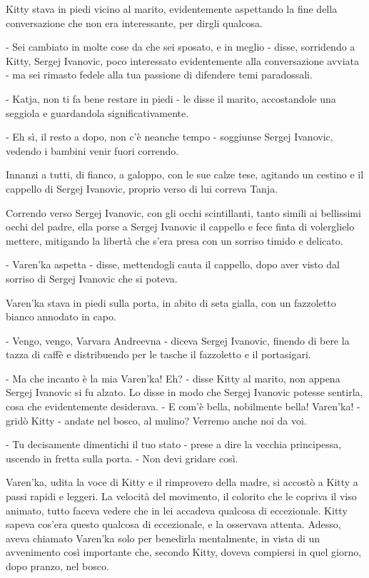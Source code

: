Kitty stava in piedi vicino al marito, evidentemente aspettando la fine della conversazione che non era interessante, per dirgli qualcosa. 

- Sei cambiato in molte cose da che sei sposato, e in meglio - disse, sorridendo a Kitty, Sergej Ivanovic, poco interessato evidentemente alla conversazione avviata - ma sei rimasto fedele alla tua passione di difendere temi paradossali. 

- Katja, non ti fa bene restare in piedi - le disse il marito, accostandole una seggiola e guardandola significativamente. 

- Eh sì, il resto a dopo, non c'è neanche tempo - soggiunse Sergej Ivanovic, vedendo i bambini venir fuori correndo. 

Innanzi a tutti, di fianco, a galoppo, con le sue calze tese, agitando un cestino e il cappello di Sergej Ivanovic, proprio verso di lui correva Tanja. 

Correndo verso Sergej Ivanovic, con gli occhi scintillanti, tanto simili ai bellissimi occhi del padre, ella porse a Sergej Ivanovic il cappello e fece finta di volerglielo mettere, mitigando la libertà che s'era presa con un sorriso timido e delicato. 

- Varen'ka aspetta - disse, mettendogli cauta il cappello, dopo aver visto dal sorriso di Sergej Ivanovic che si poteva. 

Varen'ka stava in piedi sulla porta, in abito di seta gialla, con un fazzoletto bianco annodato in capo. 

- Vengo, vengo, Varvara Andreevna - diceva Sergej Ivanovic, finendo di bere la tazza di caffè e distribuendo per le tasche il fazzoletto e il portasigari. 

- Ma che incanto è la mia Varen'ka! Eh? - disse Kitty al marito, non appena Sergej Ivanovic si fu alzato. Lo disse in modo che Sergej Ivanovic potesse sentirla, cosa che evidentemente desiderava. - E com'è bella, nobilmente bella! Varen'ka! - gridò Kitty - andate nel bosco, al mulino? Verremo anche noi da voi. 

- Tu decisamente dimentichi il tuo stato - prese a dire la vecchia principessa, uscendo in fretta sulla porta. - Non devi gridare così. 

Varen'ka, udita la voce di Kitty e il rimprovero della madre, si accostò a Kitty a passi rapidi e leggeri. La velocità del movimento, il colorito che le copriva il viso animato, tutto faceva vedere che in lei accadeva qualcosa di eccezionale. Kitty sapeva cos'era questo qualcosa di eccezionale, e la osservava attenta. Adesso, aveva chiamato Varen'ka solo per benedirla mentalmente, in vista di un avvenimento così importante che, secondo Kitty, doveva compiersi in quel giorno, dopo pranzo, nel bosco. 


